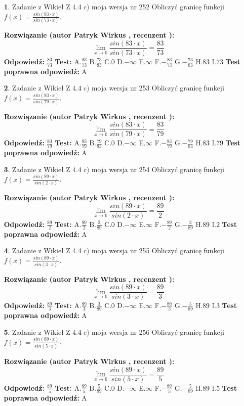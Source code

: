\documentclass[12pt, a4paper]{article}
\theoremstyle{definition} %
\newtheorem{zad}{}
\newcommand{\zadStart}[1]{\begin{zad}#1\newline}
\newcommand{\zadStop}{\end{zad}}
\newcommand{\rozwStart}[2]{\noindent \textbf{Rozwiązanie (autor #1 , recenzent #2): }\newline}
\newcommand{\rozwStop}{\newline}
\newcommand{\odpStart}{\noindent \textbf{Odpowiedź:}\newline}
\newcommand{\odpStop}{\newline}
\newcommand{\testStart}{\noindent \textbf{Test:}\newline}
\newcommand{\testStop}{\newline}
\newcommand{\kluczStart}{\noindent \textbf{Test poprawna odpowiedź:}\newline}
\newcommand{\kluczStop}{\newline}
\begin{document}
\zadStart{Zadanie z Wikieł Z 4.4 c) moja wersja nr 252}
Obliczyć granicę funkcji $f(x)=\frac{sin(83\cdot x)}{sin(73\cdot x)}$.
\zadStop
\rozwStart{Patryk Wirkus}{}
$$\lim\limits_{x\to 0}\frac{sin(83\cdot x)}{sin(73\cdot x)}=
\frac{83}{73}$$
\rozwStop
\odpStart
$\frac{83}{73}$
\odpStop
\testStart
A.$\frac{83}{73}$
B.$\frac{73}{83}$
C.$0$
D.$-\infty$
E.$\infty$
F.$-\frac{83}{73}$
G.$-\frac{73}{83}$
H.$83$
I.$73$
\testStop
\kluczStart
A
\kluczStop



\zadStart{Zadanie z Wikieł Z 4.4 c) moja wersja nr 253}
Obliczyć granicę funkcji $f(x)=\frac{sin(83\cdot x)}{sin(79\cdot x)}$.
\zadStop
\rozwStart{Patryk Wirkus}{}
$$\lim\limits_{x\to 0}\frac{sin(83\cdot x)}{sin(79\cdot x)}=
\frac{83}{79}$$
\rozwStop
\odpStart
$\frac{83}{79}$
\odpStop
\testStart
A.$\frac{83}{79}$
B.$\frac{79}{83}$
C.$0$
D.$-\infty$
E.$\infty$
F.$-\frac{83}{79}$
G.$-\frac{79}{83}$
H.$83$
I.$79$
\testStop
\kluczStart
A
\kluczStop



\zadStart{Zadanie z Wikieł Z 4.4 c) moja wersja nr 254}
Obliczyć granicę funkcji $f(x)=\frac{sin(89\cdot x)}{sin(2\cdot x)}$.
\zadStop
\rozwStart{Patryk Wirkus}{}
$$\lim\limits_{x\to 0}\frac{sin(89\cdot x)}{sin(2\cdot x)}=
\frac{89}{2}$$
\rozwStop
\odpStart
$\frac{89}{2}$
\odpStop
\testStart
A.$\frac{89}{2}$
B.$\frac{2}{89}$
C.$0$
D.$-\infty$
E.$\infty$
F.$-\frac{89}{2}$
G.$-\frac{2}{89}$
H.$89$
I.$2$
\testStop
\kluczStart
A
\kluczStop



\zadStart{Zadanie z Wikieł Z 4.4 c) moja wersja nr 255}
Obliczyć granicę funkcji $f(x)=\frac{sin(89\cdot x)}{sin(3\cdot x)}$.
\zadStop
\rozwStart{Patryk Wirkus}{}
$$\lim\limits_{x\to 0}\frac{sin(89\cdot x)}{sin(3\cdot x)}=
\frac{89}{3}$$
\rozwStop
\odpStart
$\frac{89}{3}$
\odpStop
\testStart
A.$\frac{89}{3}$
B.$\frac{3}{89}$
C.$0$
D.$-\infty$
E.$\infty$
F.$-\frac{89}{3}$
G.$-\frac{3}{89}$
H.$89$
I.$3$
\testStop
\kluczStart
A
\kluczStop



\zadStart{Zadanie z Wikieł Z 4.4 c) moja wersja nr 256}
Obliczyć granicę funkcji $f(x)=\frac{sin(89\cdot x)}{sin(5\cdot x)}$.
\zadStop
\rozwStart{Patryk Wirkus}{}
$$\lim\limits_{x\to 0}\frac{sin(89\cdot x)}{sin(5\cdot x)}=
\frac{89}{5}$$
\rozwStop
\odpStart
$\frac{89}{5}$
\odpStop
\testStart
A.$\frac{89}{5}$
B.$\frac{5}{89}$
C.$0$
D.$-\infty$
E.$\infty$
F.$-\frac{89}{5}$
G.$-\frac{5}{89}$
H.$89$
I.$5$
\testStop
\kluczStart
A
\kluczStop
\end{document}

